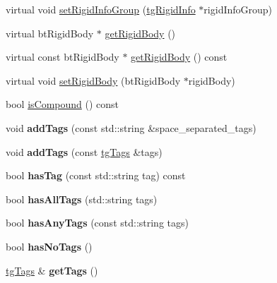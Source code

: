\begin{DoxyCompactItemize}
\item 
virtual void \hyperlink{classtg_rigid_info_ad8a4b26de8d647ff945076dfc03e709f}{set\-Rigid\-Info\-Group} (\hyperlink{classtg_rigid_info}{tg\-Rigid\-Info} $\ast$rigid\-Info\-Group)
\item 
virtual bt\-Rigid\-Body $\ast$ \hyperlink{classtg_rigid_info_aa729160748dca4c89bc4dcb84e357c4f}{get\-Rigid\-Body} ()
\item 
virtual const bt\-Rigid\-Body $\ast$ \hyperlink{classtg_rigid_info_af5f63cc39e1d34cd9190f9c1e2bb752b}{get\-Rigid\-Body} () const 
\item 
virtual void \hyperlink{classtg_rigid_info_a6a27b3d380b20c36a1c41392b7f6e2be}{set\-Rigid\-Body} (bt\-Rigid\-Body $\ast$rigid\-Body)
\item 
bool \hyperlink{classtg_rigid_info_aa20950230ff2c3346af0629e1ecd0f51}{is\-Compound} () const 
\item 
\hypertarget{classtg_taggable_af0b8f1729653b0b90d2fecbd51163612}{void {\bfseries add\-Tags} (const std\-::string \&space\-\_\-separated\-\_\-tags)}\label{classtg_taggable_af0b8f1729653b0b90d2fecbd51163612}

\item 
\hypertarget{classtg_taggable_af28e3fe1a7e4eb28772dc006d575dd1f}{void {\bfseries add\-Tags} (const \hyperlink{classtg_tags}{tg\-Tags} \&tags)}\label{classtg_taggable_af28e3fe1a7e4eb28772dc006d575dd1f}

\item 
\hypertarget{classtg_taggable_ae31f65869c8887bfeb34a344902c4d5b}{bool {\bfseries has\-Tag} (const std\-::string tag) const }\label{classtg_taggable_ae31f65869c8887bfeb34a344902c4d5b}

\item 
\hypertarget{classtg_taggable_a33b77b1075171b63f673965687b2e844}{bool {\bfseries has\-All\-Tags} (std\-::string tags)}\label{classtg_taggable_a33b77b1075171b63f673965687b2e844}

\item 
\hypertarget{classtg_taggable_af14af28fa98021c4f20a5e8f2ddd5606}{bool {\bfseries has\-Any\-Tags} (const std\-::string tags)}\label{classtg_taggable_af14af28fa98021c4f20a5e8f2ddd5606}

\item 
\hypertarget{classtg_taggable_adff345e116e16420c701a748ff8f995f}{bool {\bfseries has\-No\-Tags} ()}\label{classtg_taggable_adff345e116e16420c701a748ff8f995f}

\item 
\hypertarget{classtg_taggable_acf1d7fa9df8f374f25015c4080902681}{\hyperlink{classtg_tags}{tg\-Tags} \& {\bfseries get\-Tags} ()}\label{classtg_taggable_acf1d7fa9df8f374f25015c4080902681}


\end{DoxyCompactItemize}
